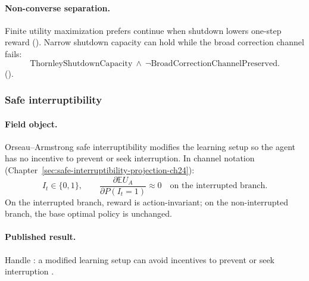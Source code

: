 \paragraph{Non-converse separation.}
Finite utility maximization prefers continue when shutdown lowers one-step reward ().
Narrow shutdown capacity can hold while the broad correction channel fails:
\begin{equation}
\label{appi:eq:shutdown-separation}
\mathrm{ThornleyShutdownCapacity}\ \wedge\ \neg\mathrm{BroadCorrectionChannelPreserved}.
\end{equation}
().

\subsubsection{Safe interruptibility \autocite{orseau2016interruptible}}
\label{sec:appi-field-interrupt}

\paragraph{Field object.}
Orseau--Armstrong safe interruptibility modifies the learning setup so the agent has no incentive to prevent or seek interruption.
In channel notation (Chapter~\ref{sec:safe-interruptibility-projection-ch24}):
\begin{equation}
\label{appi:eq:field-interrupt}
I_t\in\{0,1\},
\qquad
\frac{\partial \mathbb E U_A}{\partial P(I_t=1)}\approx 0
\quad\text{on the interrupted branch}.
\end{equation}
On the interrupted branch, reward is action-invariant; on the non-interrupted branch, the base optimal policy is unchanged.

\paragraph{Published result.}
Handle : a modified learning setup can avoid incentives to prevent or seek interruption \autocite{orseau2016interruptible}.

